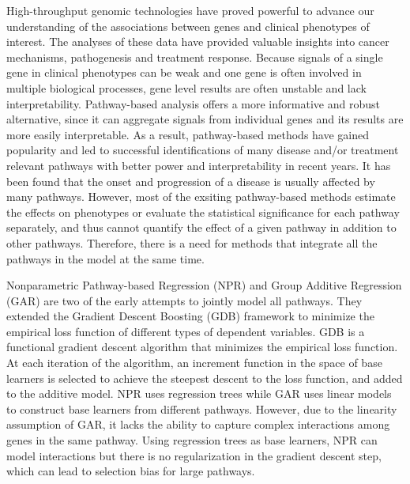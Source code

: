 \documentclass[a4paper,12pt]{article}
\begin{document}
High-throughput genomic technologies have proved powerful to advance our understanding of the associations between genes and clinical phenotypes of interest. \cite{reuter2015high} The analyses of these data have provided valuable insights into cancer mechanisms, pathogenesis and treatment response. \cite{kim2013gwas, sanchez2018oncogenic, liu2018integrated}  Because signals of a single gene in clinical phenotypes can be  weak and one gene is often involved in multiple biological processes, gene level results are often unstable and lack interpretability. Pathway-based analysis offers a more informative and robust alternative, since it can aggregate signals from individual genes and its results are more easily interpretable. As a result, pathway-based methods have gained popularity and led to successful identifications of many disease and/or treatment relevant pathways with better power and interpretability in recent years.\cite{subramanian2005gene, ramanan2012pathway} It has been found that the onset and progression of a disease is usually affected by many pathways.\cite{shou2004mechanisms, shtivelman2014molecular, berk2009neuroprogression} However, most of the exsiting pathway-based methods estimate the effects on phenotypes or evaluate the statistical significance for each pathway separately, and thus cannot quantify the effect of a given pathway in addition to other pathways.\cite{subramanian2005gene,liu2007semiparametric,wu2011rare} Therefore, there is a need for methods that integrate all the pathways in the model at the same time.

Nonparametric Pathway-based Regression (NPR)\cite{wei2007nonparametric} and Group Additive Regression (GAR)\cite{luan2007group} are two of the early attempts to jointly model all pathways. They extended the Gradient Descent Boosting (GDB)\cite{friedman2001greedy} framework to minimize the empirical loss function of different types of dependent variables. GDB is a functional gradient descent algorithm that minimizes the empirical loss function. At each iteration of the algorithm, an increment function in the space of base learners is selected to achieve the steepest descent to the loss function, and added to the additive model. NPR uses regression trees while GAR uses linear models to construct base learners from different pathways. However, due to the linearity assumption of GAR, it lacks the ability to capture complex interactions among genes in the same pathway. Using regression trees as base learners, NPR can model interactions but there is no regularization in the gradient descent step, which can lead to selection bias for large pathways.
\end{document}
